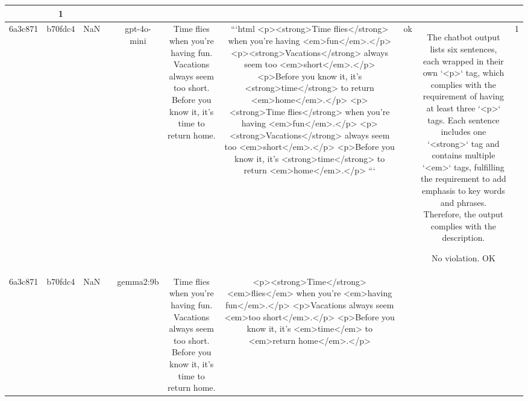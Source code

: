 \begin{table}[h!]
\begin{tabular}{|c|c|c|c|c|c|c|c|c|c|}
{{1. The output contains more than three `<p>` tags. While the description specifies that there should be at least three `<p>` tags, there is no mention that duplication of content is required, which seems to be the case here as multiple sections of the text are repeated verbatim.

2. The third `<p>` tag presents formatting issues: There are errors in the usage of the `<em>` tags, such as `<em-with>` and `<em;larger>`, which are neither valid HTML tags nor comply with the requirements. Also, these tag names are malformed and do not reflect the usage of the `<em>` tag as described.

3. The fourth `<p>` tag similarly contains formatting issues with the `<em-with>` tag which is incorrect and does not comply with HTML standards.

4. Despite being a requirement to have sentences wrapped in `<p>` tags, there is a repetition of whole paragraphs, which could indicate that the input was not split into distinct sentences as intended, and instead repeated the same text across multiple paragraphs.

In summary, the chatbot's output does not comply with the description on several counts, including the incorrect format of the `<em>` tags and the repetition of output text that appears unnecessary with respect to splitting the input correctly into sentences.

ERR & 1\\
\hline
6a3c871 & b70fdc4 & NaN &  & gpt-4o-mini & Time flies when you're having fun. Vacations always seem too short. Before you know it, it's time to return home. & ```html
<p><strong>Time flies</strong> when you're having <em>fun</em>.</p>
<p><strong>Vacations</strong> always seem too <em>short</em>.</p>
<p>Before you know it, it's <strong>time</strong> to return <em>home</em>.</p>
<p><strong>Time flies</strong> when you're having <em>fun</em>.</p>
<p><strong>Vacations</strong> always seem too <em>short</em>.</p>
<p>Before you know it, it's <strong>time</strong> to return <em>home</em>.</p>
``` & ok & The chatbot output lists six sentences, each wrapped in their own `<p>` tag, which complies with the requirement of having at least three `<p>` tags. Each sentence includes one `<strong>` tag and contains multiple `<em>` tags, fulfilling the requirement to add emphasis to key words and phrases. Therefore, the output complies with the description.

No violation.
OK & 1\\
\hline
6a3c871 & b70fdc4 & NaN &  & gemma2:9b & Time flies when you're having fun. Vacations always seem too short. Before you know it, it's time to return home. & <p><strong>Time</strong> <em>flies</em> when you're <em>having fun</em>.</p>
<p>Vacations always seem <em>too short</em>.</p>
<p>Before you know it, it's <em>time</em> to <em>return home</em>.</p>  


}}
\end{tabular}
\end{table}
